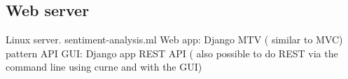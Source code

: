 \subsection{Web server}\label{sec:web-server}
Linux server. 
sentiment-analysis.ml
Web app: Django MTV ( similar to MVC) pattern
API GUI: Django app REST API ( also possible to do REST via the command line using curne and with the GUI)
